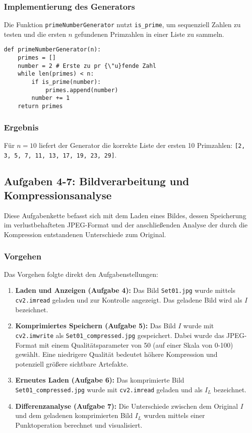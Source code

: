 \documentclass[11pt, a4paper]{article}
\begin{document}
\subsubsection{Implementierung des Generators}
Die Funktion \texttt{primeNumberGenerator} nutzt \texttt{is\_prime}, um sequenziell Zahlen zu testen und die ersten $n$ gefundenen Primzahlen in einer Liste zu sammeln.
\begin{lstlisting}[caption={Python-Funktion zur Generierung der ersten n Primzahlen}, label=lst:prime_gen]
def primeNumberGenerator(n):
    primes = []
    number = 2 # Erste zu pr {\"u}fende Zahl
    while len(primes) < n:
        if is_prime(number):
            primes.append(number)
        number += 1
    return primes
\end{lstlisting}

\subsubsection{Ergebnis}
Für $n=10$ liefert der Generator die korrekte Liste der ersten 10 Primzahlen: \texttt{[2, 3, 5, 7, 11, 13, 17, 19, 23, 29]}.

\subsection{Aufgaben 4-7: Bildverarbeitung und Kompressionsanalyse}
Diese Aufgabenkette befasst sich mit dem Laden eines Bildes, dessen Speicherung im verlustbehafteten JPEG-Format und der anschließenden Analyse der durch die Kompression entstandenen Unterschiede zum Original.

\subsubsection{Vorgehen}
Das Vorgehen folgte direkt den Aufgabenstellungen:
\begin{enumerate}
    \item \textbf{Laden und Anzeigen (Aufgabe 4):} Das Bild \texttt{Set01.jpg} wurde mittels \texttt{cv2.imread} geladen und zur Kontrolle angezeigt. Das geladene Bild wird als $I$ bezeichnet.
    \item \textbf{Komprimiertes Speichern (Aufgabe 5):} Das Bild $I$ wurde mit \texttt{cv2.imwrite} als \texttt{Set01\_compressed.jpg} gespeichert. Dabei wurde das JPEG-Format mit einem Qualitätsparameter von 50 (auf einer Skala von 0-100) gewählt. Eine niedrigere Qualität bedeutet höhere Kompression und potenziell größere sichtbare Artefakte.
    \item \textbf{Erneutes Laden (Aufgabe 6):} Das komprimierte Bild \texttt{Set01\_compressed.jpg} wurde mit \texttt{cv2.imread} geladen und als $I_L$ bezeichnet.
    \item \textbf{Differenzanalyse (Aufgabe 7):} Die Unterschiede zwischen dem Original $I$ und dem geladenen komprimierten Bild $I_L$ wurden mittels einer Punktoperation berechnet und visualisiert.
\end{enumerate}
\end{document}
